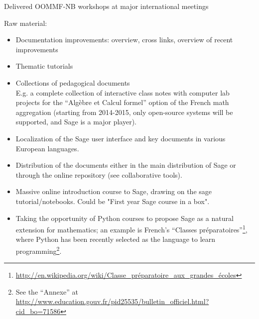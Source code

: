\begin{workpackage}[id=dissem,wphases=18-48!.5,
  title=Dissemination,
  SARM=1,
  USORM=7,
  USHRM=8
]
\begin{wpdelivs}
  \begin{wpdeliv}[due=48,id=OOMMF-NB-workshops,dissem=??,nature=??]
      {Delivered OOMMF-NB workshops at major international meetings}
\end{wpdeliv}
\end{wpdelivs}

Raw material:
\begin{itemize}
\item Documentation improvements: overview, cross links, overview of
  recent improvements
\item Thematic tutorials
\item Collections of pedagogical documents\\
  E.g. a complete collection of interactive class notes with computer
  lab projects for the ``Algèbre et Calcul formel'' option of the
  French math aggregation (starting from 2014-2015, only open-source
  systems will be supported, and Sage is a major player).
\item Localization of the Sage user interface and key documents in
  various European languages.
\item Distribution of the documents either in the main distribution of
  Sage or through the online repository (see collaborative tools).
\item Massive online introduction course to Sage, drawing on the sage tutorial/notebooks.
Could be "First year Sage course in a box".
\item Taking the opportunity of Python courses to propose Sage as a natural extension
for mathematics; an example is French's 
``Classes pr\'eparatoires''\footnote{
\url{http://en.wikipedia.org/wiki/Classe_préparatoire_aux_grandes_écoles}}, 
where Python has been recently selected as the language to learn programming\footnote{See 
the ``Annexe'' at 
\url{http://www.education.gouv.fr/pid25535/bulletin_officiel.html?cid_bo=71586}}.
\end{itemize}


\end{workpackage}

